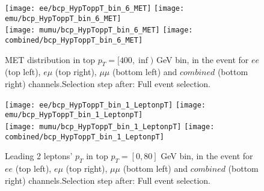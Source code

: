 \documentclass[12pt, a4paper, titlepage]{article}
\begin{document}
\clearpage
\newpage

\begin{figure}
  \texttt{[image: ee/bcp\_HypToppT\_bin\_6\_MET]}
  \texttt{[image: emu/bcp\_HypToppT\_bin\_6\_MET]}\\
  \texttt{[image: mumu/bcp\_HypToppT\_bin\_6\_MET]}
  \texttt{[image: combined/bcp\_HypToppT\_bin\_6\_MET]}
\caption{MET distribution in top $p_T = [400,\inf)$ GeV bin, in the event for $ee$ (top left), $e\mu$ (top right), $\mu\mu$ (bottom left) and $combined$ (bottom right) channels.\newline Selection step after: Full event selection.}
\end{figure}

\clearpage
\newpage












% 

\begin{figure}
  \texttt{[image: ee/bcp\_HypToppT\_bin\_1\_LeptonpT]}
  \texttt{[image: emu/bcp\_HypToppT\_bin\_1\_LeptonpT]}\\
  \texttt{[image: mumu/bcp\_HypToppT\_bin\_1\_LeptonpT]}
  \texttt{[image: combined/bcp\_HypToppT\_bin\_1\_LeptonpT]}
\caption{Leading 2 leptons' $p_T$ in top $p_T = [0,80]$ GeV bin, in the event for $ee$ (top left), $e\mu$ (top right), $\mu\mu$ (bottom left) and $combined$ (bottom right) channels.\newline Selection step after: Full event selection.}
\end{figure}
\end{document}
